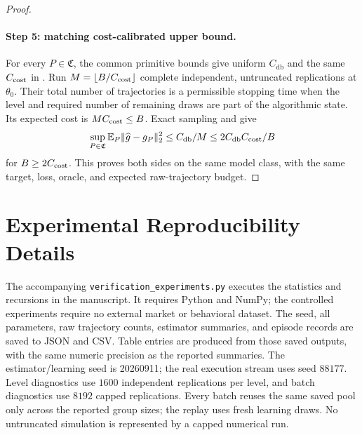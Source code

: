 \documentclass[11pt]{article}
\newcommand{\E}{\mathbb E}
\newcommand{\1}{\mathbf 1}
\DeclarePairedDelimiter{\norm}{\lVert}{\rVert}
\newcommand{\db}{\mathrm{db}}
\begin{document}
\begin{proof}
\paragraph{Step 5: matching cost-calibrated upper bound.}
For every $P\in\mathfrak C$, the common primitive bounds give uniform $C_{\db}$ and the same $C_{\rm cost}$ in . Run $M=\lfloor B/C_{\rm cost}\rfloor$ complete independent, untruncated replications at $\theta_0$. Their total number of trajectories is a permissible stopping time when the level and required number of remaining draws are part of the algorithmic state. Its expected cost is $MC_{\rm cost}\le B$. Exact sampling and  give
\[
 \sup_{P\in\mathfrak C}\E_P\norm{\widehat g-g_P}_2^2
 \le C_{\db}/M\le 2C_{\db}C_{\rm cost}/B
\]
for $B\ge2C_{\rm cost}$. This proves both sides on the same model class, with the same target, loss, oracle, and expected raw-trajectory budget.
\end{proof}


\section{Experimental Reproducibility Details}\label{app:experiments}
The accompanying \texttt{verification\_experiments.py} executes the statistics and recursions in the manuscript. It requires Python and NumPy; the controlled experiments require no external market or behavioral dataset. The seed, all parameters, raw trajectory counts, estimator summaries, and episode records are saved to JSON and CSV. Table entries are produced from those saved outputs, with the same numeric precision as the reported summaries. The estimator/learning seed is 20260911; the real execution stream uses seed $88177$. Level diagnostics use $1600$ independent replications per level, and batch diagnostics use $8192$ capped replications. Every batch reuses the same saved pool only across the reported group sizes; the replay uses fresh learning draws. No untruncated simulation is represented by a capped numerical run.
\end{document}
